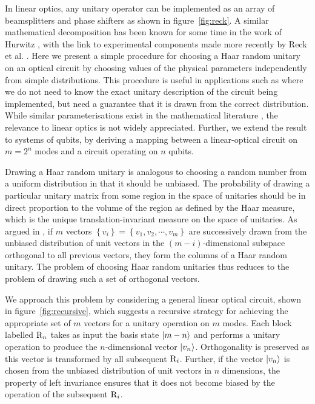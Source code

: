 In linear optics, any unitary operator can be implemented as an array of
beamsplitters and phase shifters as shown in figure~\ref{fig:reck}. A similar
mathematical decomposition has been known for some time in the work of Hurwitz
\cite{hurwitz}, with the link to experimental components made more recently by
Reck et al. \cite{reck}. Here we present a simple procedure for choosing
a Haar random unitary on an optical circuit by choosing values of the physical
parameters independently from simple distributions. This procedure is useful in
applications such as \bosonsampling{} where we do not need to know the exact
unitary description of the circuit being implemented, but need a guarantee that
it is drawn from the correct distribution. While similar parameterisations exist
in the mathematical literature \cite{spengler2012, zy-jpa-27-4235}, the
relevance to linear optics is not widely appreciated. Further, we extend the
result to systems of qubits, by deriving a mapping between a linear-optical
circuit on \(m=2^{n}\) modes and a circuit operating on \(n\) qubits.

Drawing a Haar random unitary is analogous to choosing a random number from a
uniform distribution in that it should be unbiased. The probability of drawing
a particular unitary matrix from some region in the space of unitaries should
be in direct proportion to the volume of the region as defined by the Haar
measure, which is the unique translation-invariant measure on the space of
unitaries. As argued in \cite{reffy}, if \(m\) vectors \(\left\{
v_{i} \right\} = \left\{ v_{1}, v_{2}, \cdots, v_{m} \right\}\) are successively
drawn from the unbiased distribution of unit vectors in the
\(\left(m-i\right)\)-dimensional subspace orthogonal to all previous vectors,
they form the columns of a Haar random unitary. The problem of choosing Haar
random unitaries thus reduces to the problem of drawing such a set of orthogonal
vectors.

We approach this problem by considering a general linear optical circuit, shown
in figure~\ref{fig:recursive}, which suggests a recursive strategy for
achieving the appropriate set of \(m\) vectors for a unitary operation on \(m\)
modes. Each block labelled \(\mathrm{R}_{n}\) takes
as input the basis state \( \left|m-n\right\rangle\) and performs a unitary operation to
produce the \(n\)-dimensional vector \(\left|v_n\right\rangle\). Orthogonality is preserved
as this vector is transformed by all subsequent \(\mathrm{R}_{i}\). Further, if the
vector \(\left|v_{n}\right\rangle\) is chosen from the unbiased distribution of unit vectors
in \(n\) dimensions, the property of left invariance ensures that it does not
become biased by the operation of the subsequent \(\mathrm{R}_{i}\).

